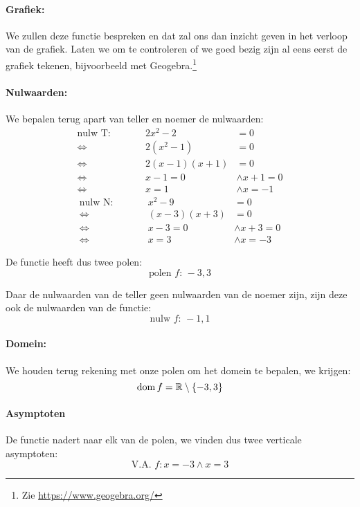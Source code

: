 \documentclass[12pt,twoside,a4paper]{article}
\begin{document}
\paragraph{Grafiek: }
We zullen deze functie bespreken en dat zal ons dan inzicht geven in het verloop van de grafiek. Laten we om te controleren of we goed bezig zijn al eens eerst de grafiek tekenen, bijvoorbeeld met Geogebra.\footnote{Zie \url{https://www.geogebra.org/}}

\paragraph{Nulwaarden: }
We bepalen terug apart van teller en noemer de nulwaarden:
\begin{align*}
  \text{nulw T:}\qquad && 2x^2-2      &= 0\\
  \Leftrightarrow               && 2(x^2 -1)   &= 0\\
  \Leftrightarrow               && 2(x-1)(x+1) &= 0\\
  \Leftrightarrow               && x-1 = 0 &\wedge x+1 = 0\\
  \Leftrightarrow               && x = 1   &\wedge x = -1
\end{align*}
\begin{align*}
  \text{nulw N:}\qquad && x^2-9      &= 0\\
  \Leftrightarrow               && (x-3)(x+3) &= 0\\
  \Leftrightarrow               && x-3 = 0 &\wedge x+3 = 0\\
  \Leftrightarrow               && x = 3   &\wedge x = -3
\end{align*}

De functie heeft dus twee polen:
$$\text{polen $f$: } -3, 3$$

Daar de nulwaarden van de teller geen nulwaarden van de noemer zijn, zijn deze ook de nulwaarden van de functie:
$$\text{nulw $f$: } -1, 1$$

\paragraph{Domein: }
We houden terug rekening met onze polen om het domein te bepalen, we krijgen:
$$\dom f = \mathbb{R} \setminus \{-3, 3\}$$

\paragraph{Asymptoten}
De functie nadert naar elk van de polen, we vinden dus twee verticale asymptoten:
$$\text{V.A. } f: x=-3 \wedge x=3$$
\end{document}

